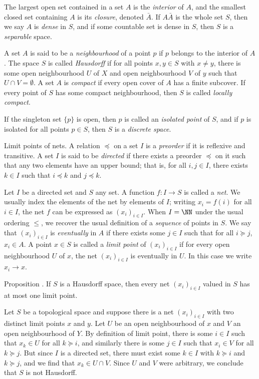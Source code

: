 The largest
open set contained in a set $A$ is the {\it interior} of $A$, and the smallest closed set containing
$A$ is its {\it closure}, denoted $\bar A$. If $A\bar A$ is the whole set $S$, then we say $A$ is
{\it dense} in $S$, and if some countable set is dense in $S$, then $S$ is a {\it separable} space.

A set $A$ is said to be a {\it neighbourhood} of a point $p$ if $p$ belongs to the interior of $A$.
The space $S$ is called {\it Hausdorff} if for all points $x,y\in S$ with $x\ne y$, there is some
open neighbourhood $U$ of $X$ and open neighbourhood $V$ of $y$ such that $U\cap V=\emptyset$.
A set $A$ is {\it compact} if every open cover of $A$ has a finite subcover. If every point of $S$
has some compact neighbourhood, then $S$ is called {\it locally compact}.

If the singleton set $\{p\}$ is open, then $p$ is called an {\it isolated point} of $S$, and if
$p$ is isolated for all points $p\in S$, then $S$ is a {\it discrete space}.

\medskip\boldlabel Limit points of nets.
A relation $\preceq$ on a set $I$ is a {\it preorder} if it is reflexive and transitive.
A set $I$ is said to be {\it directed} if there exists a preorder $\preceq$ on it such that
any two elements have an upper bound; that is,
for all $i,j\in I$, there exists $k\in I$ such that $i\preceq k$ and $j\preceq k$.

Let $I$ be a directed set and $S$ any set. A function $f:I\to S$ is called
a {\it net}. We usually index the elements of the net by elements of $I$; writing $x_i = f(i)$ for all
$i\in I$, the net $f$ can be expressed as $(x_i)_{i\in I}$. When $I = \NN$ under the usual ordering
$\le$, we recover the usual definition of a {\it sequence} of points in $S$.
We say that $(x_i)_{i\in I}$ is {\it eventually} in $A$ if there exists some $j\in I$ such that for all
$i \succeq j$, $x_i\in A$. A point $x\in S$ is called a {\it limit point} of $(x_i)_{i\in I}$ if
for every open neighbourhood $U$ of $x$, the net $(x_i)_{i\in I}$ is eventually in $U$. In this
case we write $x_i\to x$.

\proclaim Proposition \advthm. If $S$ is a Hausdorff space, then every net $(x_i)_{i\in I}$ valued
in $S$ has at most one limit point.

\proof Let $S$ be a topological space and suppose there is a net $(x_i)_{i\in I}$ with two distinct
limit points $x$ and $y$. Let $U$ be an open neighbourhood of $x$ and $V$ an open neighbourhood of $Y$.
By definition of limit point, there is some $i\in I$ such that $x_k \in U$ for all $k\succeq i$,
and similarly there is some $j\in I$ such that $x_i\in V$ for all $k\succeq j$. But since $I$
is a directed set, there must exist some $k\in I$ with $k\succeq i$ and $k\succeq j$, and we find
that $x_k\in U\cap V$. Since $U$ and $V$ were arbitrary, we conclude that $S$ is not Hausdorff.\slug

